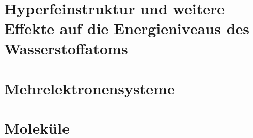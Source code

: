 \documentclass{article}
\begin{document}
    \clearpage
    \thispagestyle{empty}
    \cleardoublepage{}
    \section{Hyperfeinstruktur und weitere Effekte auf die Energieniveaus des Wasserstoffatoms}
        

        

    \clearpage
    \thispagestyle{empty}
    \cleardoublepage{}
    \section{Mehrelektronensysteme}
        
        
        
        

    \section{Moleküle}
        

    \newpage
    
\end{document}
